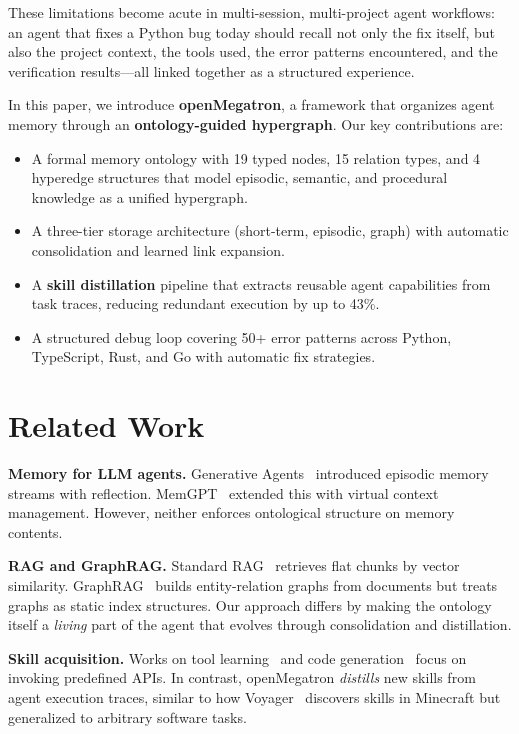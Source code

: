 \documentclass[11pt,a4paper]{article}
\begin{document}
These limitations become acute in multi-session, multi-project agent workflows:
an agent that fixes a Python bug today should recall not only the fix itself, 
but also the project context, the tools used, the error patterns encountered, 
and the verification results---all linked together as a structured experience.

In this paper, we introduce \textbf{openMegatron}, a framework that organizes 
agent memory through an \textbf{ontology-guided hypergraph}. 
Our key contributions are:

\begin{itemize}
    \item A formal memory ontology with 19 typed nodes, 15 relation types, 
    and 4 hyperedge structures that model episodic, semantic, and procedural knowledge 
    as a unified hypergraph.
    \item A three-tier storage architecture (short-term, episodic, graph) with 
    automatic consolidation and learned link expansion.
    \item A \textbf{skill distillation} pipeline that extracts reusable agent 
    capabilities from task traces, reducing redundant execution by up to 43\%.
    \item A structured debug loop covering 50+ error patterns across Python, 
    TypeScript, Rust, and Go with automatic fix strategies.
\end{itemize}

\section{Related Work}
\label{sec:related}

\textbf{Memory for LLM agents.} 
Generative Agents~\citep{park2023generative} introduced episodic memory streams 
with reflection. MemGPT~\citep{zhang2024memgpt} extended this with virtual context 
management. However, neither enforces ontological structure on memory contents.

\textbf{RAG and GraphRAG.}
Standard RAG~\citep{lewis2020retrieval} retrieves flat chunks by vector similarity. 
GraphRAG~\citep{edge2024graphrag} builds entity-relation graphs from documents 
but treats graphs as static index structures. 
Our approach differs by making the ontology itself a \textit{living} part of the agent 
that evolves through consolidation and distillation.

\textbf{Skill acquisition.}
Works on tool learning~\citep{schick2023toolformer, patil2023gorilla} and 
code generation~\citep{chen2021neuralcode} focus on invoking predefined APIs. 
In contrast, openMegatron \textit{distills} new skills from agent execution traces, 
similar to how Voyager~\citep{wang2023voyager} discovers skills in Minecraft 
but generalized to arbitrary software tasks.
\end{document}
